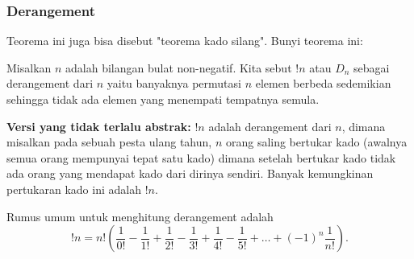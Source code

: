 \subsubsection{Derangement}
Teorema ini juga bisa disebut "teorema kado silang". Bunyi teorema ini:

Misalkan $n$ adalah bilangan bulat non-negatif. Kita sebut $!n$ atau $D_n$ sebagai derangement dari $n$ yaitu banyaknya permutasi $n$ elemen berbeda sedemikian sehingga tidak ada elemen yang menempati tempatnya semula.

\textbf{Versi yang tidak terlalu abstrak:} $!n$ adalah derangement dari $n$, dimana misalkan pada sebuah pesta ulang tahun, $n$ orang saling bertukar kado (awalnya semua orang mempunyai tepat satu kado) dimana setelah bertukar kado tidak ada orang yang mendapat kado dari dirinya sendiri. Banyak kemungkinan pertukaran kado ini adalah $!n$.

Rumus umum untuk menghitung derangement adalah
$$!n = n! \left(\dfrac{1}{0!}-\dfrac{1}{1!}+\dfrac{1}{2!}-\dfrac{1}{3!}+\dfrac{1}{4!}-\dfrac{1}{5!}+\dots+(-1)^n\dfrac{1}{n!}\right).$$